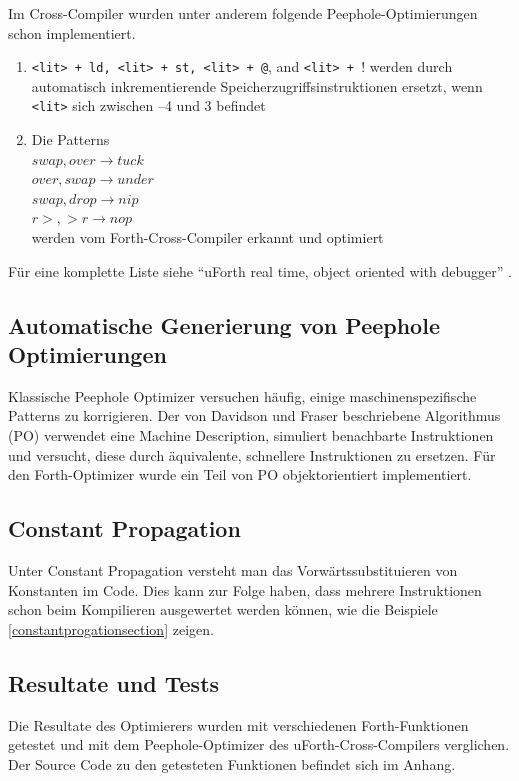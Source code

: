 Im Cross-Compiler wurden unter anderem folgende Peephole-Optimierungen schon implementiert.

\begin{enumerate}
  \item \verb!<lit> + ld, <lit> + st, <lit> + @!, and \verb!<lit> + !! werden durch automatisch inkrementierende Speicherzugriffsinstruktionen ersetzt, wenn \verb!<lit>! sich zwischen --4 und 3 befindet
  \item Die Patterns \\
					$ swap, over \rightarrow tuck$\\
					$	over, swap \rightarrow under$\\
					$	swap, drop \rightarrow nip$\\
					$	r>, >r \rightarrow nop$\\
				werden vom Forth-Cross-Compiler erkannt und optimiert\\
\end{enumerate}


Für eine komplette Liste siehe "`uForth real time, object oriented with debugger"' \cite{uforth}.

\newpage
\subsection{Automatische Generierung von Peephole Optimierungen}

Klassische Peephole Optimizer versuchen häufig, einige maschinenspezifische Patterns zu korrigieren. Der von Davidson und Fraser\cite{peepdavidson} beschriebene Algorithmus (PO) verwendet eine Machine Description, simuliert benachbarte Instruktionen und versucht, diese durch äquivalente, schnellere Instruktionen zu ersetzen. Für den Forth-Optimizer wurde ein Teil von PO objektorientiert implementiert.

\subsection{Constant Propagation}
Unter Constant Propagation versteht man das Vorwärtssubstituieren von Konstanten im Code. Dies kann zur Folge haben, dass mehrere Instruktionen schon beim Kompilieren ausgewertet werden können, wie die Beispiele \ref{constantprogationsection} zeigen.

\subsection{Resultate und Tests}
Die Resultate des Optimierers wurden mit verschiedenen Forth-Funktionen getestet und mit dem Peephole-Optimizer des uForth-Cross-Compilers verglichen. Der Source Code zu den getesteten Funktionen befindet sich im Anhang.

